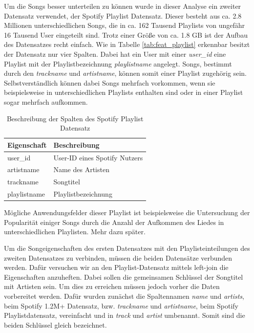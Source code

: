 \documentclass[conference]{IEEEtran}
\begin{document}
Um die Songs besser unterteilen zu können wurde in dieser Analyse ein zweiter Datensatz verwendet, der Spotify Playlist Datensatz. Dieser besteht aus ca. 2.8 Millionen unterschiedlichen Songs, die in ca. 162 Tausend Playlists von ungefähr 16 Tausend User eingeteilt sind. Trotz einer Größe von ca. 1.8 GB ist der Aufbau des Datensatzes recht einfach. Wie in Tabelle \eqref{tab:feat_playlist} erkennbar besitzt der Datensatz nur vier Spalten. Dabei hat ein User mit einer \textit{user\_id} eine Playlist mit der Playlistbezeichnung \textit{playlistname} angelegt. Songs, bestimmt durch den \textit{trackname} und \textit{artistname}, können somit einer Playlist zugehörig sein. Selbstverständlich können dabei Songs mehrfach vorkommen, wenn sie beispielsweise in unterschiedlichen Playlists enthalten sind oder in einer Playlist sogar mehrfach aufkommen.

\begin{table}[h]
    \caption{Beschreibung der Spalten des Spotify Playlist Datensatz}
    \begin{center}  
    \begin{tabular}{ll}
        Eigenschaft & Beschreibung \\ \hline
        user\_id & User-ID eines Spotify Nutzers \\
        artistname & Name des Artisten \\
        trackname & Songtitel \\
        playlistname & Playlistbezeichnung
    \end{tabular}
    \end{center}
    \label{tab:feat_playlist}
\end{table}

Mögliche Anwendungsfelder dieser Playlist ist beispielsweise die Untersuchung der Popularität einiger Songs durch die Anzahl der Aufkommen des Liedes in unterschiedlichen Playlisten. Mehr dazu später. 

Um die Songeigenschaften des ersten Datensatzes mit den Playlisteinteilungen des zweiten Datensatzes zu verbinden, müssen die beiden Datensätze verbunden werden. Dafür versuchen wir an den Playlist-Datensatz mittels left-join die Eigenschaften anzuheften. Dabei sollen die gemeinsamen Schlüssel der Songtitel mit Artisten sein. Um dies zu erreichen müssen jedoch vorher die Daten vorbereitet werden. Dafür wurden zunächst die Spaltennamen \textit{name} und \textit{artists}, beim Spotify 1.2M+ Datensatz, bzw. \textit{trackname} und \textit{artistname}, beim Spotify Playlistdatensatz, vereinfacht und in \textit{track} und \textit{artist} umbenannt. Somit sind die beiden Schlüssel gleich bezeichnet. 
\end{document}

